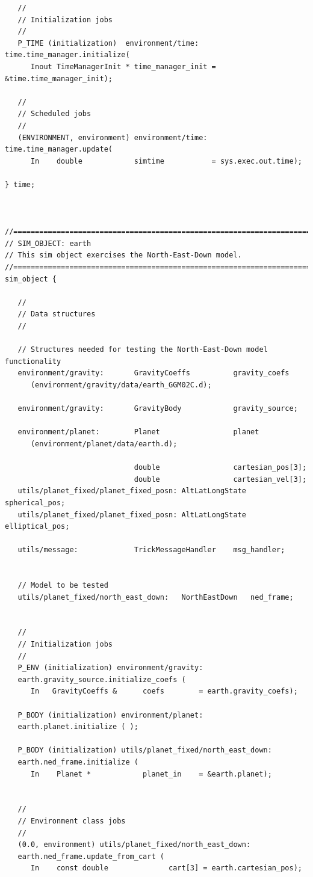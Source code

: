 \documentclass[twoside,11pt,titlepage]{report}
\begin{document}
\begin{verbatim}
   //
   // Initialization jobs
   //
   P_TIME (initialization)  environment/time: time.time_manager.initialize(
      Inout TimeManagerInit * time_manager_init = &time.time_manager_init);

   //
   // Scheduled jobs
   //
   (ENVIRONMENT, environment) environment/time: time.time_manager.update(
      In    double            simtime           = sys.exec.out.time);

} time;



//==============================================================================
// SIM_OBJECT: earth
// This sim object exercises the North-East-Down model.
//==============================================================================
sim_object {

   //
   // Data structures
   //

   // Structures needed for testing the North-East-Down model functionality
   environment/gravity:       GravityCoeffs          gravity_coefs
      (environment/gravity/data/earth_GGM02C.d);

   environment/gravity:       GravityBody            gravity_source;

   environment/planet:        Planet                 planet
      (environment/planet/data/earth.d);

                              double                 cartesian_pos[3];
                              double                 cartesian_vel[3];
   utils/planet_fixed/planet_fixed_posn: AltLatLongState spherical_pos;
   utils/planet_fixed/planet_fixed_posn: AltLatLongState elliptical_pos;

   utils/message:             TrickMessageHandler    msg_handler;


   // Model to be tested
   utils/planet_fixed/north_east_down:   NorthEastDown   ned_frame;


   //
   // Initialization jobs
   //
   P_ENV (initialization) environment/gravity:
   earth.gravity_source.initialize_coefs (
      In   GravityCoeffs &      coefs        = earth.gravity_coefs);

   P_BODY (initialization) environment/planet:
   earth.planet.initialize ( );

   P_BODY (initialization) utils/planet_fixed/north_east_down:
   earth.ned_frame.initialize (
      In    Planet *            planet_in    = &earth.planet);


   //
   // Environment class jobs
   //
   (0.0, environment) utils/planet_fixed/north_east_down:
   earth.ned_frame.update_from_cart (
      In    const double              cart[3] = earth.cartesian_pos);


\end{verbatim}
\end{document}

